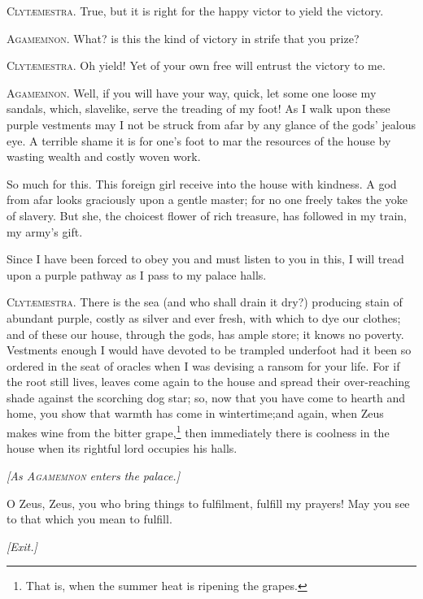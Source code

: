 \documentclass[12pt]{article}
\begin{document}
\textsc{Clyt{\ae}mestra.} True, but it is right for the happy victor to yield the victory.

\textsc{Agamemnon.} What? is this the kind of victory in strife that you prize?

\textsc{Clyt{\ae}mestra.} Oh yield! Yet of your own free will entrust the victory to me.

\textsc{Agamemnon.} Well, if you will have your way, quick, let some one loose my sandals, which, slavelike, serve the treading of my foot! As I walk upon these purple vestments may I not be struck from afar by any glance of the gods' jealous eye. A terrible shame it is for one's foot to mar the resources of the house by wasting wealth and costly woven work.

So much for this. This foreign girl receive into the house with kindness. A god from afar looks graciously upon a gentle master; for no one freely takes the yoke of slavery. But she, the choicest flower of rich treasure, has followed in my train, my army's gift.

Since I have been forced to obey you and must listen to you in this, I will tread upon a purple pathway as I pass to my palace halls.

\textsc{Clyt{\ae}mestra.} There is the sea (and who shall drain it dry?) producing stain of abundant purple, costly as silver and ever fresh, with which to dye our clothes; and of these our house, through the gods, has ample store; it knows no poverty. Vestments enough I would have devoted to be trampled underfoot had it been so ordered in the seat of oracles when I was devising a ransom for your life. For if the root still lives, leaves come again to the house and spread their over-reaching shade against the scorching dog star; so, now that you have come to hearth and home, you show that warmth has come in wintertime;and again, when Zeus makes wine from the bitter grape,\footnote{That is, when the summer heat is ripening the grapes.} then immediately there is coolness in the house when its rightful lord occupies his halls.

\begin{center}
\textit{[As \textsc{Agamemnon} enters the palace.]}
\end{center}

\noindent O Zeus, Zeus, you who bring things to fulfilment, fulfill my prayers! May you see to that which you mean to fulfill.

\begin{center}
\textit{[Exit.]}
\end{center}
\end{document}
